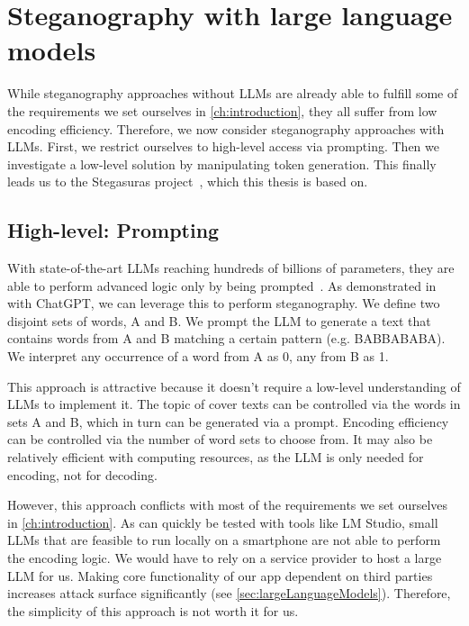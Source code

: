 \section{Steganography with large language models}
\label{sec:steganographyWithLLMs}
While steganography approaches without \glspl{LLM} are already able to fulfill some of the requirements we set ourselves in \cref{ch:introduction}, they all suffer from low encoding efficiency. Therefore, we now consider steganography approaches with \glspl{LLM}. First, we restrict ourselves to high-level access via prompting. Then we investigate a low-level solution by manipulating token generation. This finally leads us to the Stegasuras project~\cite{zieglerNeuralLinguisticSteganography2019}, which this thesis is based on.

\subsection{High-level: Prompting}
\label{sec:highLevelPrompting}
With state-of-the-art \glspl{LLM} reaching hundreds of billions of parameters, they are able to perform advanced logic only by being prompted~\cite{hossainLLMProSAnalyzingLarge2025}. As demonstrated in~\cite{steinebachNaturalLanguageSteganography2024} with ChatGPT, we can leverage this to perform steganography. We define two disjoint sets of words, A and B. We prompt the \gls{LLM} to generate a text that contains words from A and B matching a certain pattern (e.g. BABBABABA). We interpret any occurrence of a word from A as 0, any from B as 1.

This approach is attractive because it doesn't require a low-level understanding of \glspl{LLM} to implement it. The topic of cover texts can be controlled via the words in sets A and B, which in turn can be generated via a prompt. Encoding efficiency can be controlled via the number of word sets to choose from. It may also be relatively efficient with computing resources, as the \gls{LLM} is only needed for encoding, not for decoding.

However, this approach conflicts with most of the requirements we set ourselves in \cref{ch:introduction}. As can quickly be tested with tools like LM Studio, small \glspl{LLM} that are feasible to run locally on a smartphone are not able to perform the encoding logic. We would have to rely on a service provider to host a large \gls{LLM} for us. Making core functionality of our app dependent on third parties increases attack surface significantly (see \cref{sec:largeLanguageModels}). Therefore, the simplicity of this approach is not worth it for us.

